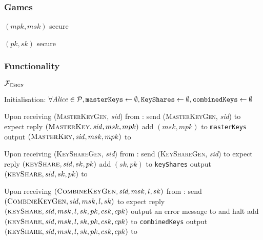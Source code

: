   \subsubsection{Games}
    \begin{gamebox}{$(mpk, msk)$ secure}
    \end{gamebox}

    \begin{gamebox}{$(pk, sk)$ secure}
    \end{gamebox}
  \subsubsection{Functionality}
    \begin{systembox}{$\mathcal{F}_{\textsc{Csign}}$}
      \begin{algorithmic}[1]
        \State Initialisation:
        \Indent
          \State $\forall \mathit{Alice} \in \mathcal{P}, \mathtt{masterKeys} \gets
          \emptyset, \mathtt{KeyShares} \gets \emptyset, \mathtt{combinedKeys}
          \gets \emptyset$
        \EndIndent
        \State

        \State Upon receiving (\textsc{MasterKeyGen}, \textit{sid}) from \alice:
        \Indent
          \State send (\textsc{MasterKeyGen}, \textit{sid}) to \adversary
          \State expect reply $(\textsc{MasterKey}, \mathit{sid}, msk, mpk)$
          \State add $(msk, mpk)$ to \texttt{masterKeys}
          \State output $(\textsc{MasterKey}, \mathit{sid}, msk, mpk)$ to \alice
        \EndIndent
        \State

        \State Upon receiving (\textsc{KeyShareGen}, \textit{sid}) from \alice:
        \Indent
          \State send (\textsc{KeyShareGen}, \textit{sid}) to \adversary
          \State expect reply $(\textsc{keyShare}, \mathit{sid}, sk, pk)$
          \State add $(sk, pk)$ to \texttt{keyShares}
          \State output $(\textsc{keyShare}, \mathit{sid}, sk, pk)$ to \alice
        \EndIndent
        \State

        \State Upon receiving $(\textsc{CombineKeyGen}, \textit{sid}, msk, l,
        sk)$ from \alice:
        \Indent
          \State send $(\textsc{CombineKeyGen}, \mathit{sid}, msk, l, sk)$ to
          \adversary
          \State expect reply $(\textsc{keyShare}, \mathit{sid}, msk, l, sk, pk,
          csk, cpk)$
            \State output an error message to \alice{} and halt
            \State add $(\textsc{keyShare}, \mathit{sid}, msk, l, sk, pk, csk,
            cpk)$ to \texttt{combinedKeys}
          \EndIf
            \State output $(\textsc{keyShare}, \mathit{sid}, msk, l, sk, pk,
            csk, cpk)$ to \alice
        \EndIndent
        \State


\end{algorithmic}
\end{systembox}
